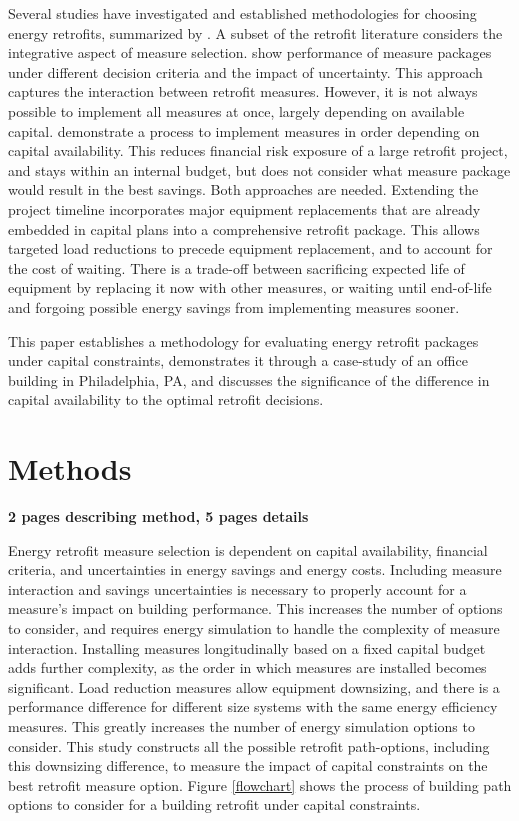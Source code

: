\documentclass[review]{elsarticle}
\begin{document}
Several studies have investigated and established methodologies for choosing energy retrofits, summarized by \cite{Ma2012889}.  A subset of the retrofit literature considers the integrative aspect of measure selection. \cite{Rysanek2013324} show performance of measure packages under different decision criteria and the impact of uncertainty.  This approach captures the interaction between retrofit measures.  However, it is not always possible to implement all measures at once, largely depending on available capital.  \cite{Kumbaroglu2012327} demonstrate a process to implement measures in order depending on capital availability.  This reduces financial risk exposure of a large retrofit project, and stays within an internal budget, but does not consider what measure package would result in the best savings.  Both approaches are needed.  Extending the project timeline incorporates major equipment replacements that are already embedded in capital plans into a comprehensive retrofit package.  This allows targeted load reductions to precede equipment replacement, and to account for the cost of waiting.  There is a trade-off between sacrificing expected life of equipment by replacing it now with other measures, or waiting until end-of-life and forgoing possible energy savings from implementing measures sooner.\par 
This paper establishes a methodology for evaluating energy retrofit packages under capital constraints, demonstrates it through a case-study of an office building in Philadelphia, PA, and discusses the significance of the difference in capital availability to the optimal retrofit decisions.  

\section{Methods}
\textbf{2 pages describing method, 5 pages details} \par
Energy retrofit measure selection is dependent on capital availability, financial criteria, and uncertainties in energy savings and energy costs.  Including measure interaction and savings uncertainties is necessary to properly account for a measure's impact on building performance.  This increases the number of options to consider, and requires energy simulation to handle the complexity of measure interaction.  Installing measures longitudinally based on a fixed capital budget adds further complexity, as the order in which measures are installed becomes significant. Load reduction measures allow equipment downsizing, and there is a performance difference for different size systems with the same energy efficiency  measures.  This greatly increases the number of energy simulation options to consider.
This study constructs all the possible retrofit path-options, including this downsizing difference, to measure the impact of capital constraints on the best retrofit measure option.   Figure \ref{flowchart} shows the process of building path options to consider for a building retrofit under capital constraints.
\end{document}
